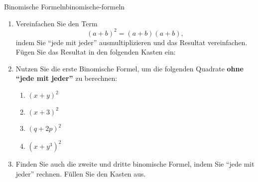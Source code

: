 \begin{LA}
    {Binomische Formeln}{binomische-formeln}
    \begin{enumerate}
        \item Vereinfachen Sie den Term
              \[
                  (a+b)^2=(a+b)(a+b),
              \]
              indem Sie \enquote{jede mit jeder} ausmultiplizieren und das Resultat vereinfachen. Fügen Sie das Resultat in den folgenden Kasten ein:

              \begin{center}
              \end{center}

        \item Nutzen Sie die erste Binomische Formel, um die folgenden Quadrate \textbf{ohne \enquote{jede mit jeder}} zu berechnen:

              \begin{enumerate}
                  \item \((x+y)^2\)\vspace*{0.5cm}
                  \item \((x+3)^2\)\vspace*{0.5cm}
                  \item \((q+2p)^2\)\vspace*{0.5cm}
                  \item \((x+y^3)^2\)\vspace*{0.5cm}
              \end{enumerate}

        \item Finden Sie auch die zweite und dritte binomische Formel, indem Sie \enquote{jede mit jeder} rechnen. Füllen Sie den Kasten aus.

              \begin{center}
\end{center}
\end{enumerate}
\end{LA}
